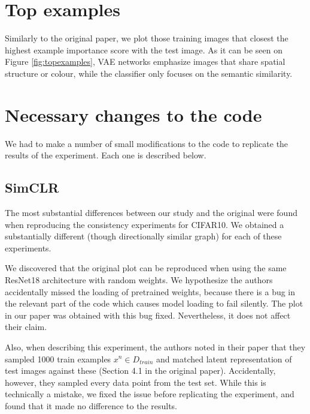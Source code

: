 
\appendix
\section{Top examples}
\label{sec:vae_vs_classifier}

Similarly to the original paper, we plot those training images that closest the highest example importance score with the test image. As it can be seen on Figure \ref{fig:topexamples}, VAE networks emphasize images that share spatial structure or colour, while the classifier only focuses on the semantic similarity.

\section{Necessary changes to the code}
\label{sec:changesincode}

We had to make a number of small modifications to the code to replicate the results of the experiment. Each one is described below.

\subsection{SimCLR}

The most substantial differences between our study and the original were found when reproducing the consistency experiments for CIFAR10. We obtained a substantially different (though directionally similar graph) for each of these experiments.

\hspace{1em}

We discovered that the original plot can be reproduced when using the same ResNet18\cite{he2016residual} architecture with random weights. We hypothesize the authors accidentally missed the loading of pretrained weights, because there is a bug in the relevant part of the code which causes model loading to fail silently. The plot in our paper was obtained with this bug fixed. Nevertheless, it does not affect their claim.

\hspace{1em}

Also, when describing this experiment, the authors noted in their paper that they sampled 1000 train examples $x^n \in D_{train}$ and matched latent representation of test images against these (Section 4.1 in the original paper). Accidentally, however, they sampled every data point from the test set. While this is technically a mistake, we fixed the issue before replicating the experiment, and found that it made no difference to the results.


